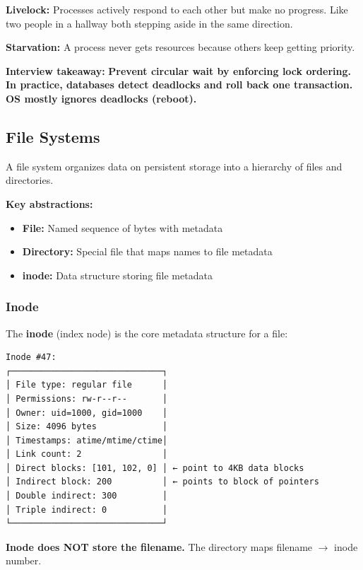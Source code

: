 \documentclass[11pt]{article}
\providecommand{\tightlist}{\setlength{\itemsep}{1pt}\setlength{\parskip}{0pt}}
\begin{document}
\textbf{Livelock:} Processes actively respond to each other but make no progress. Like two people in a hallway both stepping aside in the same direction.

\textbf{Starvation:} A process never gets resources because others keep getting priority.

\textbf{Interview takeaway:} \textbf{Prevent circular wait by enforcing lock ordering. In practice, databases detect deadlocks and roll back one transaction. OS mostly ignores deadlocks (reboot).}

\subsection{File Systems}\label{file-systems}

A file system organizes data on persistent storage into a hierarchy of files and directories.

\textbf{Key abstractions:}

\begin{itemize}
\tightlist
\item
  \textbf{File:} Named sequence of bytes with metadata
\item
  \textbf{Directory:} Special file that maps names to file metadata
\item
  \textbf{inode:} Data structure storing file metadata
\end{itemize}

\subsubsection{Inode}\label{inode}

The \textbf{inode} (index node) is the core metadata structure for a file:

\setcodelang{}

\begin{verbatim}
Inode #47:
┌──────────────────────────────┐
│ File type: regular file      │
│ Permissions: rw-r--r--       │
│ Owner: uid=1000, gid=1000    │
│ Size: 4096 bytes             │
│ Timestamps: atime/mtime/ctime│
│ Link count: 2                │
│ Direct blocks: [101, 102, 0] │ ← point to 4KB data blocks
│ Indirect block: 200          │ ← points to block of pointers
│ Double indirect: 300         │
│ Triple indirect: 0           │
└──────────────────────────────┘
\end{verbatim}

\textbf{Inode does NOT store the filename.} The directory maps filename \(\rightarrow\) inode number.
\end{document}
